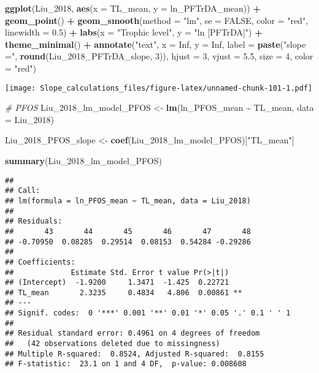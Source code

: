 \documentclass[
]{article}
\newenvironment{Shaded}{\begin{snugshade}}{\end{snugshade}}
\newcommand{\AttributeTok}[1]{\textcolor[rgb]{0.13,0.29,0.53}{#1}}
\newcommand{\CommentTok}[1]{\textcolor[rgb]{0.56,0.35,0.01}{\textit{#1}}}
\newcommand{\ConstantTok}[1]{\textcolor[rgb]{0.56,0.35,0.01}{#1}}
\newcommand{\DecValTok}[1]{\textcolor[rgb]{0.00,0.00,0.81}{#1}}
\newcommand{\FloatTok}[1]{\textcolor[rgb]{0.00,0.00,0.81}{#1}}
\newcommand{\FunctionTok}[1]{\textcolor[rgb]{0.13,0.29,0.53}{\textbf{#1}}}
\newcommand{\NormalTok}[1]{#1}
\newcommand{\OtherTok}[1]{\textcolor[rgb]{0.56,0.35,0.01}{#1}}
\newcommand{\SpecialCharTok}[1]{\textcolor[rgb]{0.81,0.36,0.00}{\textbf{#1}}}
\newcommand{\StringTok}[1]{\textcolor[rgb]{0.31,0.60,0.02}{#1}}
\begin{document}
\begin{Shaded}
\begin{Highlighting}[]
\FunctionTok{ggplot}\NormalTok{(Liu\_2018, }\FunctionTok{aes}\NormalTok{(}\AttributeTok{x =}\NormalTok{ TL\_mean, }\AttributeTok{y =}\NormalTok{ ln\_PFTrDA\_mean)) }\SpecialCharTok{+}
  \FunctionTok{geom\_point}\NormalTok{() }\SpecialCharTok{+}
  \FunctionTok{geom\_smooth}\NormalTok{(}\AttributeTok{method =} \StringTok{"lm"}\NormalTok{, }\AttributeTok{se =} \ConstantTok{FALSE}\NormalTok{, }\AttributeTok{color =} \StringTok{"red"}\NormalTok{, }\AttributeTok{linewidth =} \FloatTok{0.5}\NormalTok{) }\SpecialCharTok{+}
  \FunctionTok{labs}\NormalTok{(}\AttributeTok{x =} \StringTok{"Trophic level"}\NormalTok{,}
       \AttributeTok{y =} \StringTok{"ln [PFTrDA]"}\NormalTok{) }\SpecialCharTok{+}
  \FunctionTok{theme\_minimal}\NormalTok{() }\SpecialCharTok{+}
  \FunctionTok{annotate}\NormalTok{(}\StringTok{"text"}\NormalTok{, }\AttributeTok{x =} \ConstantTok{Inf}\NormalTok{, }\AttributeTok{y =} \ConstantTok{Inf}\NormalTok{, }\AttributeTok{label =} \FunctionTok{paste}\NormalTok{(}\StringTok{"slope ="}\NormalTok{, }\FunctionTok{round}\NormalTok{(Liu\_2018\_PFTrDA\_slope, }\DecValTok{3}\NormalTok{)), }
           \AttributeTok{hjust =} \DecValTok{3}\NormalTok{, }\AttributeTok{vjust =} \FloatTok{5.5}\NormalTok{, }\AttributeTok{size =} \DecValTok{4}\NormalTok{, }\AttributeTok{color =} \StringTok{"red"}\NormalTok{)}
\end{Highlighting}
\end{Shaded}

\texttt{[image: Slope\_calculations\_files/figure-latex/unnamed-chunk-101-1.pdf]}

\begin{Shaded}
\begin{Highlighting}[]
\CommentTok{\# PFOS}
\NormalTok{Liu\_2018\_lm\_model\_PFOS }\OtherTok{\textless{}{-}} \FunctionTok{lm}\NormalTok{(ln\_PFOS\_mean }\SpecialCharTok{\textasciitilde{}}\NormalTok{ TL\_mean,}
                             \AttributeTok{data =}\NormalTok{ Liu\_2018)}

\NormalTok{Liu\_2018\_PFOS\_slope }\OtherTok{\textless{}{-}} \FunctionTok{coef}\NormalTok{(Liu\_2018\_lm\_model\_PFOS)[}\StringTok{"TL\_mean"}\NormalTok{]}

\FunctionTok{summary}\NormalTok{(Liu\_2018\_lm\_model\_PFOS)}
\end{Highlighting}
\end{Shaded}

\begin{verbatim}
## 
## Call:
## lm(formula = ln_PFOS_mean ~ TL_mean, data = Liu_2018)
## 
## Residuals:
##       43       44       45       46       47       48 
## -0.70950  0.08285  0.29514  0.08153  0.54284 -0.29286 
## 
## Coefficients:
##             Estimate Std. Error t value Pr(>|t|)   
## (Intercept)  -1.9200     1.3471  -1.425  0.22721   
## TL_mean       2.3235     0.4834   4.806  0.00861 **
## ---
## Signif. codes:  0 '***' 0.001 '**' 0.01 '*' 0.05 '.' 0.1 ' ' 1
## 
## Residual standard error: 0.4961 on 4 degrees of freedom
##   (42 observations deleted due to missingness)
## Multiple R-squared:  0.8524, Adjusted R-squared:  0.8155 
## F-statistic:  23.1 on 1 and 4 DF,  p-value: 0.008608
\end{verbatim}
\end{document}
